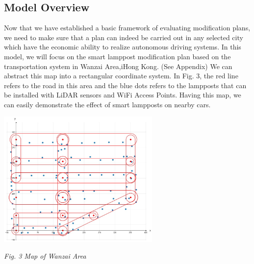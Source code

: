 \documentclass[12pt]{article}
\theoremstyle{definition}
\theoremstyle{remark}
\numberwithin{equation}{section}
\begin{document}
		\subsection{Model Overview}
		Now that we have established a basic framework of evaluating modification plans, we need to make sure that a plan can indeed be carried out in any selected city which have the economic ability to realize autonomous driving systems.	In this model, we will focus on the smart lamppost modification plan based on the transportation system in Wanzai Area,iHong Kong.\cite{Map} (See Appendix) We can abstract this map into a rectangular coordinate system. In Fig. 3, the red line refers to the road in this area and the blue dots refers to the lampposts that can be installed with LiDAR sensors and WiFi Access Points. Having this map, we can easily demonstrate the effect of smart lampposts on nearby cars.
		\begin{center}
			\includegraphics[width=8cm]{abstract.jpg}
			
			\small \textit{Fig. 3 Map of Wanzai Area}
		\end{center}
	
\end{document}
